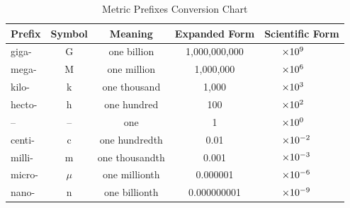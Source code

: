 \begin{table}[h!]
\centering

\begin{tabular}{l c c c l}
\toprule
\textbf{Prefix} & \textbf{Symbol} & \textbf{Meaning} & \textbf{Expanded Form} & \textbf{Scientific Form}\\
\midrule
giga- & G & one billion & 1,000,000,000 & $\hspace{4ex}\times 10^{9}$\\ 
mega- & M & one million & 1,000,000 & $\hspace{4ex}\times 10^{6}$\\ 
kilo- & k & one thousand & 1,000 & $\hspace{4ex}\times 10^{3}$\\ 
hecto- & h & one hundred & 100 & $\hspace{4ex}\times 10^{2}$\\ 
-- & -- & one & 1 & $\hspace{4ex}\times 10^{0}$\\ 
centi- & c & one hundredth & 0.01 & $\hspace{4ex}\times 10^{-2}$\\ 
milli- & m & one thousandth & 0.001 & $\hspace{4ex}\times 10^{-3}$\\ 
micro- & $\mu$ & one millionth & 0.000001 & $\hspace{4ex}\times 10^{-6}$\\ 
nano- & n & one billionth & 0.000000001 & $\hspace{4ex}\times 10^{-9}$\\ 
\bottomrule
\end{tabular}
\captionsetup{font=small, labelfont=bf}
\caption{Metric Prefixes Conversion Chart}
\end{table}
\newpage
{}
